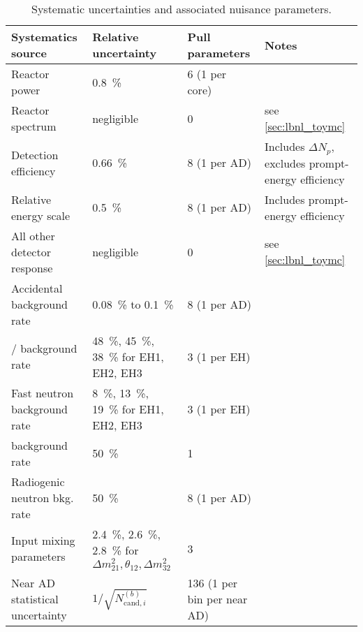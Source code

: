 \begin{table}[ht]
    \centering
    \footnotesize
    \begin{tabular}[t]{lp{3.1cm}p{2.5cm}p{3.8cm}}
        \toprule
        Systematics source & Relative uncertainty
                          & Pull parameters
                          & Notes\\
        \midrule
        Reactor power & \SI{0.8}{\percent}
                      & 6 (1 per core) & \\
        Reactor spectrum & negligible
                         & 0
                         & see \cref{sec:lbnl_toymc} \\
        Detection efficiency & \SI{0.66}{\percent}
                             & 8 (1 per AD)
                             & Includes $\Delta N_p$, excludes prompt-energy efficiency \\
        Relative energy scale & \SI{0.5}{\percent}
                              & 8 (1 per AD) & Includes prompt-energy efficiency \\
        All other detector response & negligible
                                    & 0
                                    & see \cref{sec:lbnl_toymc} \\
        Accidental background rate & \SI{0.08}{\percent} to \SI{0.1}{\percent}
                                   & 8 (1 per AD)
                                   & \\
        \li{}/\he{} background rate &
        \SI{48}{\percent}, \SI{45}{\percent}, \SI{38}{\percent} for EH1, EH2, EH3
                                    & 3 (1 per EH) & \\
        Fast neutron background rate &
        \SI{8}{\percent}, \SI{13}{\percent}, \SI{19}{\percent} for EH1, EH2, EH3
                                     & 3 (1 per EH) & \\
        \amc{} background rate & \SI{50}{\percent}
                             & 1 & \\
        Radiogenic neutron bkg. rate & \SI{50}{\percent}
                                           & 8 (1 per AD) & \\
        Input mixing parameters &
        \SI{2.4}{\percent}, \SI{2.6}{\percent}, \SI{2.8}{\percent} for
        $\Delta m^2_{21},\theta_{12}, \Delta m^2_{32}$
                                & 3
                                & \\
        Near AD statistical uncertainty & $1/\sqrt{N_{\text{cand},i}^{(b)}}$
                                        & 136 (1 per bin per near AD)&\\
        \bottomrule
    \end{tabular}
    \caption[Systematics summary]{Systematic uncertainties and associated nuisance parameters.}
    \label{tab:systs}
\end{table}

